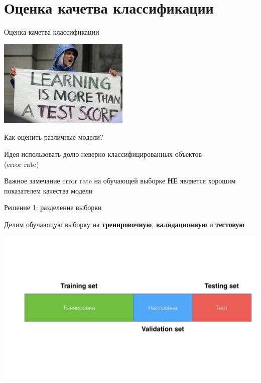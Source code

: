 \documentclass[aspectratio=169]{beamer}
\begin{document}
\section{Оценка качетва классификации}

\begin{frame}{}

\begin{center}
\Large Оценка качетва классификации

\vspace{1em}
\includegraphics[scale=0.7]{images/learning.jpg}
\end{center}

\end{frame}

\begin{frame}{Как оценить различные модели?}

\begin{block}{Идея}
использовать долю неверно классифицированных объектов \\ (error rate)
\end{block}

\begin{alertblock}{Важное замечание}
error rate на обучающей выборке {\bf НЕ} является хорошим показателем качества модели
\end{alertblock}

\end{frame}

\begin{frame}{Решение 1: разделение выборки}

Делим обучающую выборку на {\bf тренировочную}, {\bf валидационную} и {\bf тестовую}

\begin{center}
\includegraphics[scale=0.15]{images/vtt.png}
\end{center}
  
\end{frame}
\end{document}
